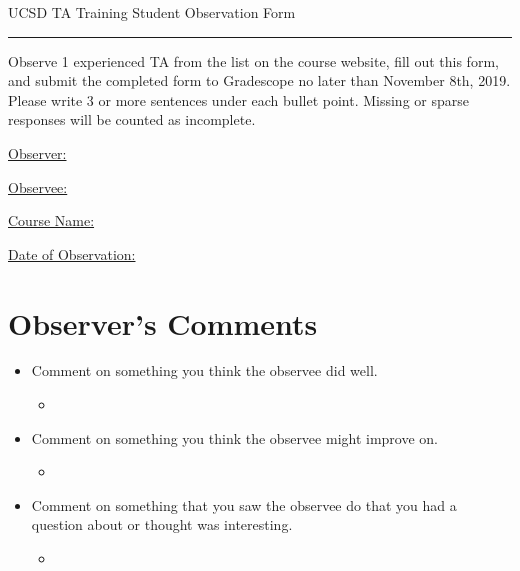 \documentclass[journal,onecolumn,11pt,final]{IEEEtran}
\begin{document}
\begin{center}
	{\LARGE UCSD TA Training Student Observation Form}
\end{center}
\hrule height 1pt 

\vspace{10pt}
\noindent
Observe 1 experienced TA from the list on the course website, fill out this form, and submit the completed form to Gradescope no later than November 8th, 2019. Please write 3 or more sentences under each bullet point. Missing or sparse responses will be counted as incomplete.

\vspace{10pt}

\underline{Observer:}

\vspace{10pt}
\underline{Observee:}

\vspace{10pt}
\underline{Course Name:}

\vspace{10pt}
\underline{Date of Observation:}

\section*{Observer's Comments}

\begin{itemize}
	\item Comment on something you think the observee did well.
	\begin{itemize}
		\item %
	\end{itemize}
	
	\vspace{120pt}
	\item Comment on something you think the observee might improve on.
	\begin{itemize}
		\item %
	\end{itemize}
	
	\vspace{120pt}
	\item Comment on something that you saw the observee do that you had a question about or thought was interesting. 
	\begin{itemize}
		\item %
	\end{itemize}
	
\end{itemize}
\end{document}
